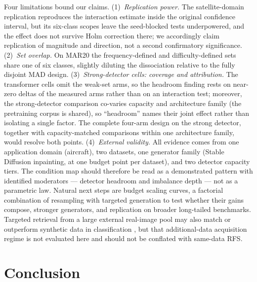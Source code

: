 \documentclass[preprint,12pt,authoryear]{elsarticle}
\begin{document}
Four limitations bound our claims. (1)~\emph{Replication power.} The
satellite-domain replication reproduces the interaction estimate inside
the original confidence interval, but its six-class scopes leave the
seed-blocked tests underpowered, and the effect does not survive Holm
correction there; we accordingly claim replication of magnitude and
direction, not a second confirmatory significance. (2)~\emph{Set
overlap.} On MAR20 the frequency-defined and difficulty-defined sets
share one of six classes, slightly diluting the dissociation relative to
the fully disjoint MAD design. (3)~\emph{Strong-detector cells: coverage
and attribution.} The transformer cells omit the weak-set arms, so the
headroom finding rests on near-zero deltas of the measured arms rather
than on an interaction test; moreover, the strong-detector comparison
co-varies capacity and architecture family (the pretraining corpus is
shared), so ``headroom'' names their joint effect rather than isolating
a single factor. The complete four-arm design on the strong detector,
together with capacity-matched comparisons within one architecture
family, would resolve both points. (4)~\emph{External validity.} All evidence comes
from one application domain (aircraft), two datasets, one generator
family (Stable Diffusion inpainting, at one budget point per dataset),
and two detector capacity tiers. The condition map should therefore be
read as a demonstrated pattern with identified moderators --- detector
headroom and imbalance depth --- not as a parametric law. Natural next
steps are budget scaling curves, a factorial combination of resampling
with targeted generation to test whether their gains compose, stronger
generators, and replication on broader long-tailed benchmarks. Targeted
retrieval from a large external real-image pool may also match or
outperform synthetic data in classification \citep{geng2024unmet}, but
that additional-data acquisition regime is not evaluated here and should
not be conflated with same-data RFS.

\section{Conclusion}\label{sec:conclusion}
\end{document}
